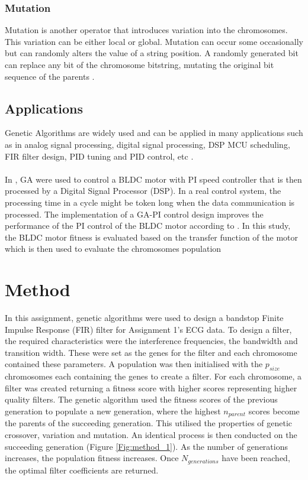 \documentclass[a4paper, 11pt]{article}
\begin{document}
        \subsubsection{Mutation}
            Mutation is another operator that introduces variation into the chromosomes. This variation can be either
            local or global. Mutation can occur some occasionally but can randomly alters the value of a string
            position. A randomly generated bit can replace any bit of the chromosome bitstring, mutating the original
            bit sequence of the parents \cite{Tang1996}.

        \subsection{Applications}
        Genetic Algorithms are widely used and can be applied in many applications such as in analog signal processing, 
        digital signal processing, DSP MCU scheduling, FIR filter design, PID tuning and PID control, etc 
        \cite{Chen2017, Fleming1993, Cao2012, Fabijanski2008, Miyata2018, Amphlett1996}.
        \\\\
        In \cite{Chen2017}, GA were used to control a BLDC motor with PI speed controller that is then processed by 
        a Digital Signal Processor (DSP). In a real control system, the processing time in a cycle might be token long
        when the data communication is processed. The implementation of a GA-PI control design improves the performance of
        the PI control of the BLDC motor according to \cite{Chen2017}. In this study, the BLDC motor fitness is evaluated
        based on the transfer function of the motor which is then used to evaluate the chromosomes population 


\section{Method}\label{sec:meth}
    In this assignment, genetic algorithms were used to design a bandstop Finite Impulse Response (FIR) filter for Assignment 1's 
    ECG data. To design a filter, the required characteristics were the interference frequencies, the bandwidth and transition width. 
    These were set as the genes for the filter and each chromosome contained these parameters.
    A population was then initialised with the $p_{size}$ chromosomes each containing the genes to create a filter. 
    For each chromosome, a filter was created returning a fitness score with higher scores 
    representing higher quality filters. The genetic algorithm used the fitness scores of the previous generation
    to populate a new generation, where the highest $n_{parent}$ scores become the parents of the succeeding generation. 
    This utilised the properties of genetic crossover, variation and mutation. An identical process is then conducted on the 
    succeeding generation (Figure \ref{Fig:method_1}). 
    As the number of generations increases, the population fitness increases. Once $N_{generations}$ have been reached, the
    optimal filter coefficients are returned. 
\end{document}
